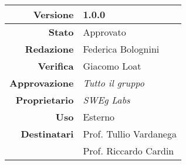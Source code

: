 \begin{center}
\begin{tabular}{r|l}
    \textbf{Versione} & 1.0.0 \\
    \hline
    \textbf{Stato} & Approvato \\
    \hline
    \textbf{Redazione} & Federica Bolognini \\
    \hline
    \textbf{Verifica} & Giacomo Loat \\
    \hline
    \textbf{Approvazione} & \emph{Tutto il gruppo} \\
    \hline
    \textbf{Proprietario} & \emph{SWEg Labs} \\
    \hline
    \textbf{Uso} & Esterno \\
    \hline
    \textbf{Destinatari} & Prof. Tullio Vardanega \\
                         & Prof. Riccardo Cardin \\
\end{tabular}
\end{center}
